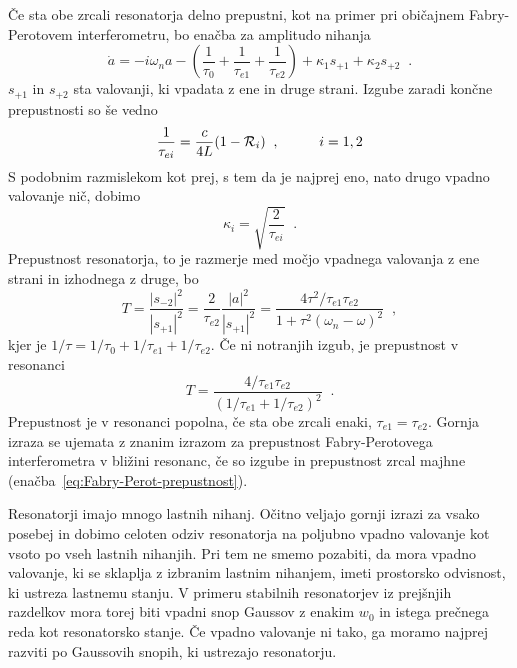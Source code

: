 Če sta obe zrcali resonatorja delno prepustni, kot na primer pri običajnem
Fabry-Perotovem interferometru, bo enačba za amplitudo nihanja 
\begin{equation}
\dot{a}=-i\omega_{n}a-(\frac{1}{\tau_{0}}+\frac{1}{\tau_{e1}}+\frac{1}{\tau_{e2}})+\kappa_{1}s_{+1}+
\kappa_{2}s_{+2}\;\;.\label{3.49}
\end{equation}
 $s_{+1}$ in $s_{+2}$ sta valovanji, ki vpadata z ene in druge strani.
Izgube zaradi končne prepustnosti so še vedno 
\begin{equation}
\frac{1}{\tau_{ei}}=\frac{c}{4L}(1-{\cal R}_{i})\;\;,\mbox{\hskip1cm}i=1,2\label{3.50}
\end{equation}
 S podobnim razmislekom kot prej, s tem da je najprej eno, nato drugo
vpadno valovanje nič, dobimo 
\begin{equation}
\kappa_{i}=\sqrt{\frac{2}{\tau_{ei}}}\;\;.\label{3.51}
\end{equation}
 Prepustnost resonatorja, to je razmerje med močjo vpadnega valovanja
z ene strani in izhodnega z druge, bo 
\begin{equation}
T=\frac{|s_{-2}|^{2}}{|s_{+1}|^{2}}=\frac{2}{\tau_{e2}}\frac{|a|^{2}}{|s_{+1}|^{2}}=\frac{4\tau^{2}/
\tau_{e1}\tau_{e2}}{1+\tau^{2}(\omega_{n}-\omega)^{2}}\;\;,\label{3.52}
\end{equation}
 kjer je $1/\tau=1/\tau_{0}+1/\tau_{e1}+1/\tau_{e2}$. Če ni notranjih
izgub, je prepustnost v resonanci 
\begin{equation}
T=\frac{4/\tau_{e1}\tau_{e2}}{(1/\tau_{e1}+1/\tau_{e2})^{2}}\;\;.\label{3.53}
\end{equation}
 Prepustnost je v resonanci popolna, če sta obe zrcali enaki, $\tau_{e1}=\tau_{e2}$.
Gornja izraza se ujemata z znanim izrazom 
za prepustnost Fabry-Perotovega interferometra v bližini resonanc,
če so izgube in prepustnost zrcal majhne (enačba~\ref{eq:Fabry-Perot-prepustnost}).

Resonatorji imajo mnogo lastnih nihanj. Očitno veljajo gornji izrazi
za vsako posebej in dobimo celoten odziv resonatorja na poljubno vpadno
valovanje kot vsoto po vseh lastnih nihanjih. Pri tem ne smemo pozabiti,
da mora vpadno valovanje, ki se sklaplja z izbranim lastnim nihanjem,
imeti prostorsko odvisnost, ki ustreza lastnemu stanju. V primeru
stabilnih resonatorjev iz prejšnjih razdelkov mora torej biti vpadni
snop Gaussov z enakim $w_{0}$ in istega prečnega reda kot resonatorsko
stanje. Če vpadno valovanje ni tako, ga moramo najprej razviti po
Gaussovih snopih, ki ustrezajo resonatorju.

